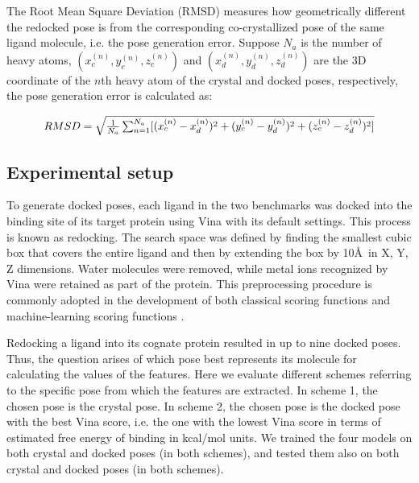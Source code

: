 \documentclass[twocolumn]{bmcart}
\begin{document}
The Root Mean Square Deviation (RMSD) measures how geometrically different the redocked pose is from the corresponding co-crystallized pose of the same ligand molecule, i.e. the pose generation error. Suppose $N_a$ is the number of heavy atoms, $(x_c^{(n)}, y_c^{(n)}, z_c^{(n)})$ and $(x_d^{(n)}, y_d^{(n)}, z_d^{(n)})$ are the 3D coordinate of the $n$th heavy atom of the crystal and docked poses, respectively, the pose generation error is calculated as:

\begin{equation}
\resizebox{.85\hsize}{!}{$RMSD = \sqrt{\frac{1}{N_a}\sum_{n=1}^{N_a}[(x_c^{(n)}-x_d^{(n)})^2+(y_c^{(n)}-y_d^{(n)})^2+(z_c^{(n)}-z_d^{(n)})^2]}$}
\label{rescoring2:rmsd}
\end{equation}

\subsection*{Experimental setup}

To generate docked poses, each ligand in the two benchmarks was docked into the binding site of its target protein using Vina with its default settings. This process is known as redocking. The search space was defined by finding the smallest cubic box that covers the entire ligand and then by extending the box by 10\AA\ in X, Y, Z dimensions. Water molecules were removed, while metal ions recognized by Vina were retained as part of the protein. This preprocessing procedure is commonly adopted in the development of both classical scoring functions \cite{595} and machine-learning scoring functions \cite{1347}.

Redocking a ligand into its cognate protein resulted in up to nine docked poses. Thus, the question arises of which pose best represents its molecule for calculating the values of the features. Here we evaluate different schemes referring to the specific pose from which the features are extracted. In scheme 1, the chosen pose is the crystal pose. In scheme 2, the chosen pose is the docked pose with the best Vina score, i.e. the one with the lowest Vina score in terms of estimated free energy of binding in kcal/mol units. We trained the four models on both crystal and docked poses (in both schemes), and tested them also on both crystal and docked poses (in both schemes).
\end{document}

